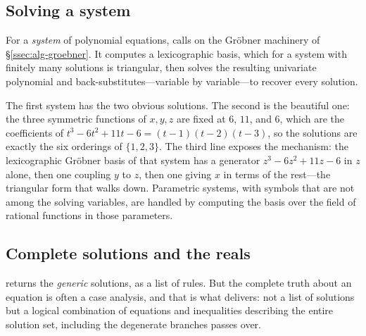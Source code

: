 \subsection{Solving a system}
\label{ssec:alg-solve-systems}

For a \emph{system} of polynomial equations,  calls on the Gr\"obner machinery
of \S\ref{ssec:alg-groebner}. It computes a lexicographic basis, which for a system with
finitely many solutions is triangular, then solves the resulting univariate polynomial
and back-substitutes---variable by variable---to recover every solution.


The first system has the two obvious solutions. The second is the beautiful one: the
three symmetric functions of $x,y,z$ are fixed at $6$, $11$, and $6$, which are the
coefficients of $t^3-6t^2+11t-6=(t-1)(t-2)(t-3)$, so the solutions are exactly the six
orderings of $\{1,2,3\}$. The third line exposes the mechanism: the lexicographic
Gr\"obner basis of that system has a generator $z^3-6z^2+11z-6$ in $z$ alone, then one
coupling $y$ to $z$, then one giving $x$ in terms of the rest---the triangular form that
 walks down. Parametric systems, with symbols that are not among the solving variables,
are handled by computing the basis over the field of rational functions in those
parameters.

\subsection{Complete solutions and the reals}
\label{ssec:alg-reduce}

 returns the \emph{generic} solutions, as a list of rules. But the complete
truth about an equation is often a case analysis, and that is what  delivers:
not a list of solutions but a logical combination of equations and inequalities
describing the entire solution set, including the degenerate branches  passes
over.

